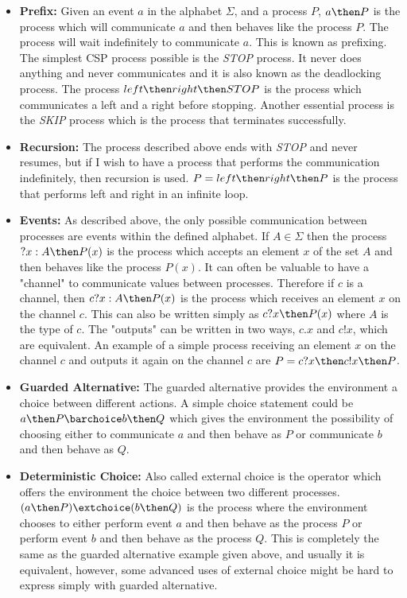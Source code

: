 \begin{itemize}
    \item \textbf{Prefix:} Given an event $a$ in the alphabet $\Sigma$, and a process $P$, $a \then P$ is the process which will communicate $a$ and then behaves like the process $P$. The process will wait indefinitely to communicate $a$. This is known as prefixing.
    The simplest CSP process possible is the \textit{STOP} process. It never does anything and never communicates and it is also known as the deadlocking process. The process $left \then right \then STOP$ is the process which communicates a left and a right before stopping. Another essential process is the \textit{SKIP} process which is the process that terminates successfully.
    \item \textbf{Recursion:} The process described above ends with \textit{STOP} and never resumes, but if I wish to have a process that performs the communication indefinitely, then recursion is used.
    $P = left \then right \then P$ is the process that performs left and right in an infinite loop.
    \item \textbf{Events:} As described above, the only possible communication between processes are events within the defined alphabet. If $A \in \Sigma$ then the process $?x : A \then P(x)$ is the process which accepts an element $x$ of the set $A$ and then behaves like the process $P(x)$.
    It can often be valuable to have a "channel" to communicate values between processes. Therefore if $c$ is a channel, then $c?x : A \then P(x)$ is the process which receives an element $x$ on the channel $c$. This can also be written simply as $c?x \then P(x)$ where $A$ is the type of $c$. The "outputs" can be written in two ways, $c.x$ and $c!x$, which are equivalent. An example of a simple process receiving an element $x$ on the channel $c$ and outputs it again on the channel $c$ are $P = c?x \then c!x \then P$.
    \item \textbf{Guarded Alternative:} The guarded alternative provides the environment a choice between different actions. A simple choice statement could be $a \then P \barchoice b \then Q$ which gives the environment the possibility of choosing either to communicate $a$ and then behave as $P$ or communicate $b$ and then behave as $Q$.
    \item \textbf{Deterministic Choice:} Also called external choice is the operator which offers the environment the choice between two different processes. $(a \then P) \extchoice (b \then Q)$ is the process where the environment chooses to either perform event $a$ and then behave as the process $P$ or perform event $b$ and then behave as the process $Q$. This is completely the same as the guarded alternative example given above, and usually it is equivalent, however, some advanced uses of external choice might be hard to express simply with guarded alternative.

\end{itemize}
